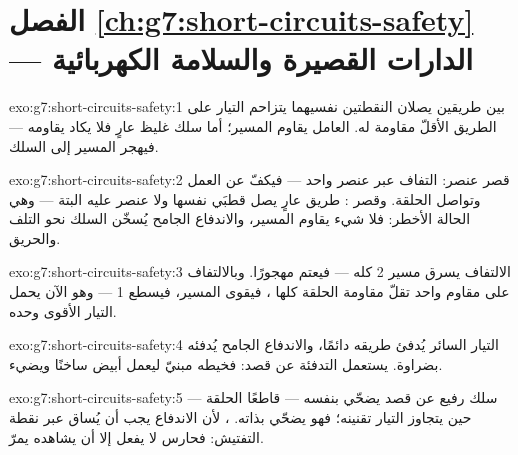 \section*{الفصل \ref{ch:g7:short-circuits-safety} --- الدارات القصيرة والسلامة الكهربائية}

\begin{solution}{exo:g7:short-circuits-safety:1}
بين طريقين يصلان النقطتين نفسيهما يتزاحم التيار على الطريق
الأقلّ مقاومة له.  العامل يقاوم المسير؛ أما سلك غليظ
عارٍ فلا يكاد يقاومه --- فيهجر المسير  إلى السلك.
\end{solution}

\begin{solution}{exo:g7:short-circuits-safety:2}
قصر عنصر: التفاف عبر عنصر واحد --- فيكفّ عن العمل وتواصل
الحلقة. وقصر : طريق عارٍ يصل قطبَي  نفسها ولا
عنصر عليه البتة --- وهي الحالة الأخطر: فلا شيء يقاوم المسير،
والاندفاع الجامح يُسخّن السلك  نحو التلف والحريق.
\end{solution}

\begin{solution}{exo:g7:short-circuits-safety:3}
الالتفاف يسرق مسير  2 كله --- فيعتم مهجورًا. وبالالتفاف
على مقاوم واحد تقلّ مقاومة الحلقة كلها ، فيقوى المسير،
فيسطع  1 --- وهو الآن يحمل التيار الأقوى وحده.
\end{solution}

\begin{solution}{exo:g7:short-circuits-safety:4}
التيار السائر يُدفئ طريقه دائمًا، والاندفاع الجامح يُدفئه
بضراوة.  يستعمل التدفئة عن قصد: فخيطه مبنيّ ليعمل أبيض
ساخنًا ويضيء.
\end{solution}

\begin{solution}{exo:g7:short-circuits-safety:5}
سلك رفيع عن قصد يضحّي بنفسه  --- قاطعًا الحلقة --- حين
يتجاوز التيار تقنينه؛ فهو يضحّي بذاته. ، لأن
الاندفاع يجب أن يُساق عبر نقطة التفتيش: فحارس  لا
يفعل إلا أن يشاهده يمرّ.
\end{solution}

